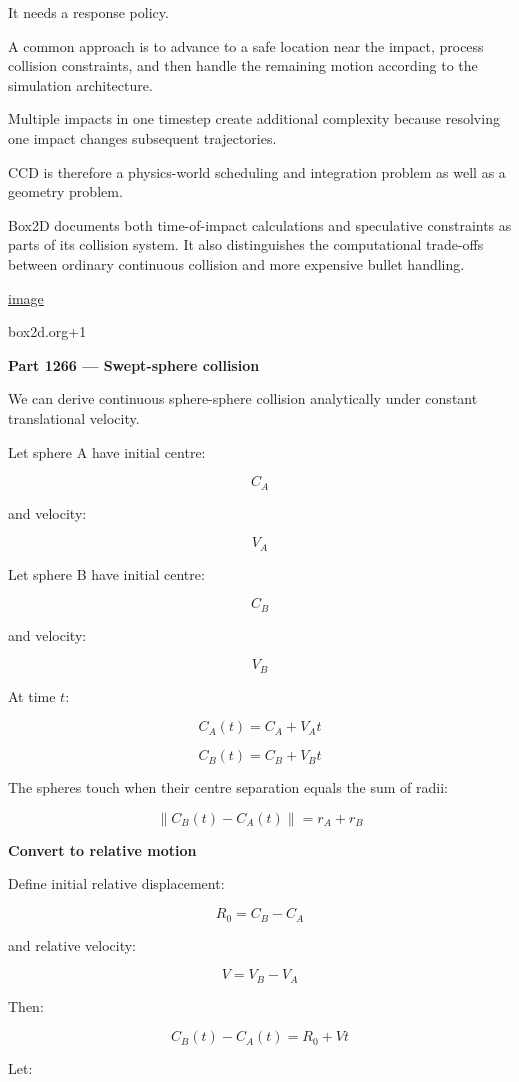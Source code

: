 It needs a response policy.

A common approach is to advance to a safe location near the impact, process collision constraints, and then handle the remaining motion according to the simulation architecture.

Multiple impacts in one timestep create additional complexity because resolving one impact changes subsequent trajectories.

CCD is therefore a physics-world scheduling and integration problem as well as a geometry problem.

Box2D documents both time-of-impact calculations and speculative constraints as parts of its collision system. It also distinguishes the computational trade-offs between ordinary continuous collision and more expensive bullet handling. 

\href{https://www.google.com/s2/favicons?domain=https://box2d.org&sz=32}{image}

box2d.org+1

\textbf{Part 1266 --- Swept-sphere collision}

We can derive continuous sphere-sphere collision analytically under constant translational velocity.

Let sphere A have initial centre:

\[
C_A
\]

and velocity:

\[
V_A
\]

Let sphere B have initial centre:

\[
C_B
\]

and velocity:

\[
V_B
\]

At time \(t\):

\[
C_A(t)=C_A+V_At
\]

\[
C_B(t)=C_B+V_Bt
\]

The spheres touch when their centre separation equals the sum of radii:

\[
\boxed{ \|C_B(t)-C_A(t)\|=r_A+r_B }
\]

\textbf{Convert to relative motion}

Define initial relative displacement:

\[
\boxed{ R_0=C_B-C_A }
\]

and relative velocity:

\[
\boxed{ V=V_B-V_A }
\]

Then:

\[
C_B(t)-C_A(t)=R_0+Vt
\]

Let:


